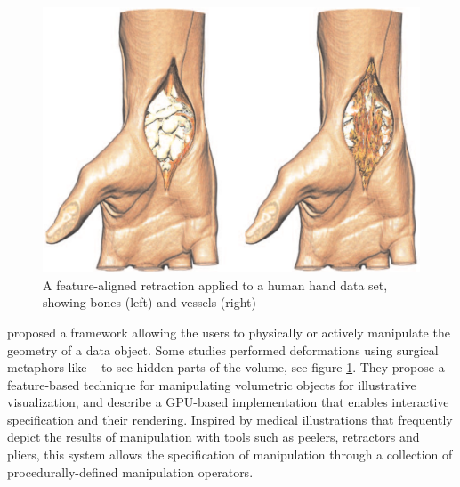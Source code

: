 \begin{figure}
\centering
\includegraphics[width=\textwidth]{Figures/cut}
\decoRule
\caption[ Feature Aligned Volume Manipulation]{ A feature-aligned retraction applied to a human hand data set, showing bones (left) and vessels (right)}
\label{fig:cut}
\end{figure}
\cite{Correa:2007:IDD:1313046.1313163} proposed a framework  allowing the users to physically or actively manipulate the geometry of a data object. Some studies performed deformations using surgical metaphors like ~\cite{4069230,Correa:2006:FAV:1187627.1187827} to see hidden parts of the volume, see figure \ref{fig:cut}. They propose a feature-based technique for manipulating volumetric objects for illustrative visualization, and describe a GPU-based implementation that enables interactive specification and their rendering.
Inspired by medical illustrations that frequently
depict the results of manipulation with tools such as peelers,
retractors and pliers, this system allows the specification of manipulation
through a collection of procedurally-defined manipulation operators.



